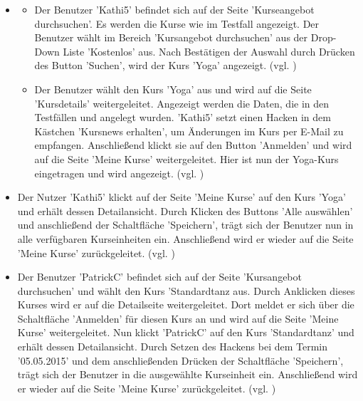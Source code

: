 \documentclass[a4paper]{scrreprt}
\begin{document}
			\begin{itemize}
				\item {} 
					\begin{itemize}
						\item Der Benutzer 'Kathi5' befindet sich auf der Seite 'Kurseangebot durchsuchen'. Es werden die Kurse wie im Testfall  angezeigt. Der Benutzer wählt im Bereich 'Kursangebot durchsuchen' aus der Drop-Down Liste 'Kostenlos' aus. Nach Bestätigen der Auswahl durch Drücken des Button 'Suchen', wird der Kurs 'Yoga' angezeigt. (vgl. )
						
						\item Der Benutzer wählt den Kurs 'Yoga' aus und wird auf die Seite 'Kursdetails' weitergeleitet. Angezeigt werden die Daten, die in den Testfällen  und  angelegt wurden. 'Kathi5' setzt einen Hacken in dem Kästchen 'Kursnews erhalten', um Änderungen im Kurs per E-Mail zu empfangen. Anschließend klickt sie auf den Button 'Anmelden' und wird auf die Seite 'Meine Kurse' weitergeleitet. Hier ist nun der Yoga-Kurs eingetragen und wird angezeigt. (vgl. )
					\end{itemize}
				
				\item {} 
				Der Nutzer 'Kathi5'	klickt auf der Seite 'Meine Kurse' auf den Kurs 'Yoga' und erhält dessen Detailansicht. Durch Klicken des Buttons 'Alle auswählen' und anschließend der Schaltfläche 'Speichern', trägt sich der Benutzer nun in alle verfügbaren Kurseinheiten ein. Anschließend wird er wieder auf die Seite 'Meine Kurse' zurückgeleitet. (vgl. )
				
				\item {} 
				Der Benutzer 'PatrickC' befindet sich auf der Seite 'Kursangebot durchsuchen' und wählt den Kurs 'Standardtanz aus. Durch Anklicken dieses Kurses wird er auf die Detailseite weitergeleitet. Dort meldet er sich über die Schaltfläche 'Anmelden' für diesen Kurs an und wird auf die Seite 'Meine Kurse' weitergeleitet. Nun klickt 'PatrickC' auf den Kurs 'Standardtanz' und erhält dessen Detailansicht. Durch Setzen des Hackens bei dem Termin '05.05.2015' und dem anschließenden Drücken der Schaltfläche 'Speichern', trägt sich der Benutzer in die ausgewählte Kurseinheit ein. Anschließend wird er wieder auf die Seite 'Meine Kurse' zurückgeleitet. (vgl. )
				

\end{itemize}
\end{document}
